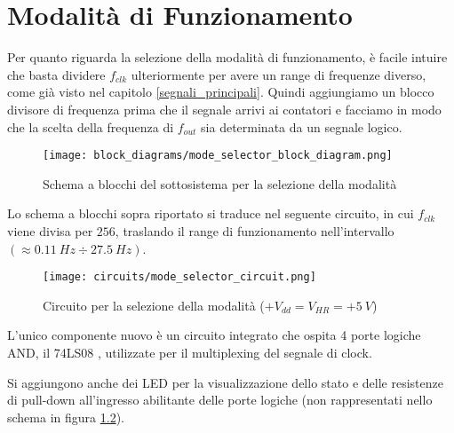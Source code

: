 \chapter{Modalità di Funzionamento}


Per quanto riguarda la selezione della modalità di funzionamento, è facile intuire che basta
dividere $f_{clk}$ ulteriormente per avere un range di frequenze diverso, come già visto nel
capitolo \ref{segnali_principali}. Quindi aggiungiamo un blocco divisore di frequenza prima
che il segnale arrivi ai contatori e facciamo in modo che la scelta della frequenza di
$f_{out}$ sia determinata da un segnale logico.

\begin{figure}[H]
    \centering
    \texttt{[image: block\_diagrams/mode\_selector\_block\_diagram.png]}
    \caption{Schema a blocchi del sottosistema per la selezione della modalità}
    \label{mode_selector_block_diagram}
\end{figure}

Lo schema a blocchi sopra riportato si traduce nel seguente circuito, in cui $f_{clk}$
viene divisa per $256$, traslando il range di funzionamento nell'intervallo
$(\approx0.11\ Hz\div27.5\ Hz)$.

\begin{figure}[H]
    \centering
    \texttt{[image: circuits/mode\_selector\_circuit.png]}
    \caption{Circuito per la selezione della modalità ($+V_{dd}=V_{HR}=+5\ V$)}
    \label{mode_selector_circuit}
\end{figure}

L'unico componente nuovo è un circuito integrato che ospita 4 porte logiche AND, il 74LS08
\cite{74ls08}, utilizzate per il multiplexing del segnale di clock.

Si aggiungono anche dei LED per la visualizzazione dello stato e delle resistenze di pull-down
all'ingresso abilitante delle porte logiche (non rappresentati nello schema in figura
\ref{mode_selector_circuit}).

